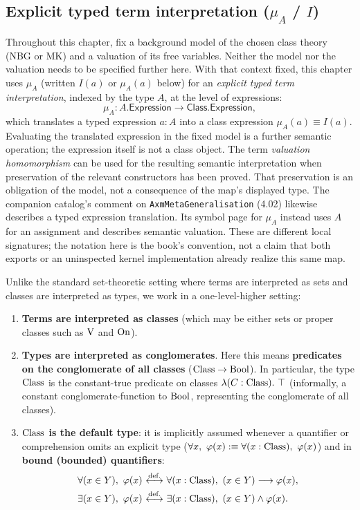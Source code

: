 \subsection{Explicit typed term interpretation (\texorpdfstring{$\mu_A$ / $I$}{mu-A / I})}
Throughout this chapter, fix a background model of the chosen class
theory (NBG or MK) and a valuation of its free variables. Neither the
model nor the valuation needs to be specified further here.
With that context fixed, this chapter uses $\mu_A$ (written $I(a)$ or
$\mu_A(a)$ below) for an \emph{explicit typed term interpretation},
indexed by the type $A$, at the level of expressions:
\[
\mu_A : A.\mathsf{Expression} \to \mathsf{Class}.\mathsf{Expression},
\]
which translates a typed expression $a:A$ into a class expression
$\mu_A(a)\equiv I(a)$. Evaluating the translated expression in the fixed
model is a further semantic operation; the expression itself is not a
class object. The term \emph{valuation homomorphism}
can be used for the resulting semantic interpretation when preservation of
the relevant constructors has been proved. That preservation is an
obligation of the model, not a consequence of the map's displayed type.
The companion catalog's comment on \texttt{AxmMetaGeneralisation} (4.02)
likewise describes a typed expression translation. Its symbol page for
$\mu_A$ instead uses $A$ for an assignment and describes semantic
valuation. These are different local signatures; the notation here is
the book's convention, not a claim that both exports or an uninspected
kernel implementation already realize this same map.

\begin{note}[advanced semantic setting: terms as classes, conglomerates (= predicates on classes) as types]
Unlike the standard set-theoretic setting where terms are interpreted as sets and classes are interpreted as types, we work in a one-level-higher setting:
\begin{enumerate}
\item \textbf{Terms are interpreted as classes} (which may be either sets or proper classes such as $\mathrm{V}$ and $\mathrm{On}$).
\item \textbf{Types are interpreted as conglomerates}. Here this means
\textbf{predicates on the conglomerate of all classes}
(${\text{Class}} \to \mathrm{Bool}$). In particular, the type ${\text{Class}}$ is the
constant-true predicate on classes $\lambda (C:{\text{Class}}).\ \top$
(informally, a constant conglomerate-function to $\mathrm{Bool}$, representing
the conglomerate of all classes).
\item \textbf{${\text{Class}}$ is the default type}: it is implicitly assumed whenever a quantifier or comprehension omits an explicit type ($\forall x,\ \varphi(x) :\equiv \forall (x:{\text{Class}}),\ \varphi(x)$) and in \textbf{bound (bounded) quantifiers}:
\[
\begin{aligned}
\forall (x\in Y),\ \varphi(x) &\ {\stackrel{{\textrm{def.}}}{\longleftrightarrow}}\  \forall (x:{\text{Class}}),\ (x\in Y)\longrightarrow \varphi(x),\\
\exists (x\in Y),\ \varphi(x) &\ {\stackrel{{\textrm{def.}}}{\longleftrightarrow}}\  \exists (x:{\text{Class}}),\ (x\in Y)\land \varphi(x).
\end{aligned}
\]
\end{enumerate}
\end{note}


